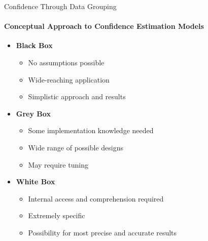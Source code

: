 \documentclass{beamer}
\begin{document}
\begin{frame}[t]{Confidence Through Data Grouping}
  \framesubtitle{Conceptual Approach to Confidence Estimation Models}
  \begin{itemize}
    \setlength\itemsep{1em}
  \item \textbf{Black Box}
      \begin{itemize}
        \item No assumptions possible
        \item Wide-reaching application
        \item Simplistic approach and results
      \end{itemize}

    \item \textbf{Grey Box}
      \begin{itemize}
        \item Some implementation knowledge needed
        \item Wide range of possible designs
        \item May require tuning
      \end{itemize}

    \item \textbf{White Box}
      \begin{itemize}
        \item Internal access and comprehension required
        \item Extremely specific
        \item Possibility for most precise and accurate results
      \end{itemize}

  \end{itemize}
\end{frame}
\end{document}
